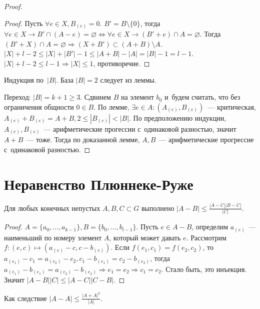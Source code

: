 \documentclass{article}
\begin{document}
\begin{proof}
\begin{proof}
		Пусть $\forall e \in X, B_{(e)} = {0}$. $B' = B \setminus \{0\}$, тогда
		$\forall e \in X \rightarrow B' \cap (A - e) = \varnothing \Leftrightarrow
		\forall e \in X \rightarrow (B' + e) \cap A = \varnothing$. Тогда $(B' + X)
		\cap A = \varnothing \Rightarrow (X + B') \subset (A + B) \setminus A$.
		$|X| + l - 2 \le |X| + |B'| - 1 \le |A + B| - |A| = |B| - 1 = l - 1$. $|X| +
		l - 2 \le l - 1 \Rightarrow |X| \le 1$, противоречие.
	\end{proof}

	Индукция по~$|B|$. База $|B| = 2$ следует из леммы.

	Переход: $|B| = k + 1 \ge 3$. Сдвинем $B$ на элемент $b_0$ и~будем считать,
	что без ограничения общности $0 \in B$. По лемме, $\exists e \in A: (A_{(e)},
	B_{(e)})$~--- критическая, $A_{(e)} + B_{(e)} = A + B, 2 \le |B_{(e)}| < |B|$.
	По предположению индукции, $A_{(e)}, B_{(e)}$~--- арифметические прогессии
	с~одинаковой разностью, значит $A + B$~--- тоже. Тогда по доказанной лемме,
	$A, B$~--- арифметические прогрессие с~одинаковой разностью.
\end{proof}

\section{Неравенство Плюннеке-Руже}

\begin{theorem}
	Для любых конечных непустых $A, B, C \subset G$ выполнено $|A - B| \le
	\frac{|A - C||B - C|}{|C|}$.
\end{theorem}
\begin{proof}
	$A = \{a_0, \ldots, a_{k-1}\}, B = \{b_0, \ldots, b_{l-1}\}$. Пусть $e \in A -
	B$, определим $a_{(e)}$~--- наименьший по номеру элемент $A$, который может
	давать $e$. Рассмотрим $f: (e, c) \mapsto (a_{(e)} - c, c - b_{(e)})$. Если
	$f(e_1, c_1) = f(e_2, c_2)$, то $a_{(e_1)} - c_1 = a_{(e_2)} - c_2, c_1 -
	b_{(e_1)} = c_2 - b_{(e_2)}$, тогда $a_{(e_1)} - b_{(e_1)} = a_{(e_2)} -
	b_{(e_2)} \Rightarrow e_1 = e_2 \Rightarrow c_1 = c_2$. Стало быть, это
	инъекция. Значит $|A - B||C| \le |A - C||C - B|$.
\end{proof}

Как следствие $|A - A| \le \frac{|A + A|^2}{|A|}$.
\end{document}
